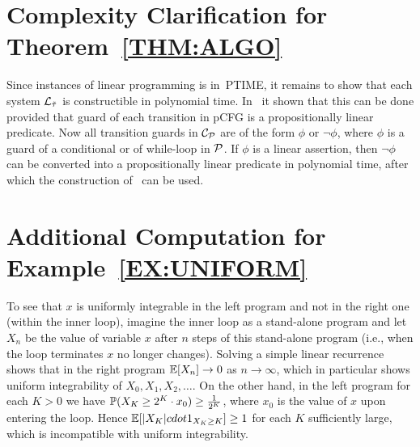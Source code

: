 \section{Complexity Clarification for Theorem~\ref{THM:ALGO}}

Since instances of linear programming is in~\textsc{PTIME}, it remains to show 
that each system $\mathcal{L}_{\tilde{\tau}}$ is constructible in polynomial 
time. In~\cite{CFNH16:prob-termination} it shown that this can be done provided 
that guard of each transition in pCFG is a propositionally linear predicate. 
Now all transition guards in $\mathcal{C}_{\mathcal{P}}$ are of the form $\phi$ or 
$\neg\phi$, where $\phi$ is a guard of a conditional or of while-loop in 
$\mathcal{P}$. If $\phi$ is a linear assertion, then $\neg\phi$ can be converted 
into a propositionally linear predicate in polynomial time, after which the 
construction of~\cite{CFNH16:prob-termination} can be used. 

\section{Additional Computation for Example~\ref{EX:UNIFORM}}

 To see that $x$ is uniformly integrable in the left program and not in the 
 right one (within the inner loop), 
 imagine the inner loop as a stand-alone program and let $X_n$ be the value of 
 variable $x$ after $n$ steps of this stand-alone program (i.e., when the loop 
 terminates $x$ no longer changes). Solving a simple linear recurrence shows 
 that in the right program $\mathbb{E}[X_n] \rightarrow 0$ as $n\rightarrow \infty$, 
 which in particular shows uniform integrability of $X_0,X_1,X_2,\dots$. On the 
 other hand, in the left program for each $K>0$ we have $\mathbb{P}(X_K \geq 
 2^K\cdot{x_0})\geq \frac{1}{2^K}$, where $x_0$ is the value of $x$ upon 
 entering the loop. Hence $\mathbb{E}[|X_K|cdot{1}_{X_K 
 	\geq K}]\geq 1$ for each $K$ sufficiently large, which is incompatible with 
 uniform integrability. 
 



